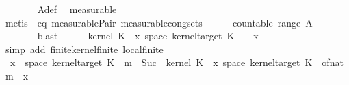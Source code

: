 \begin{isabellebody}
\ \ \ \ \ \ \isamarkupfalse%
\ A{\isacharunderscore}{\kern0pt}def\ \isamarkupfalse%
\ measurable\isanewline
\ \ \ \ \ \ \isamarkupfalse%
\ {\isacharparenleft}{\kern0pt}metis\ {\isasymomega}\ eq\ measurable{\isacharunderscore}{\kern0pt}Pair{}{\isacharprime}{\kern0pt}\ measurable{\isacharunderscore}{\kern0pt}cong{\isacharunderscore}{\kern0pt}sets{\isacharparenright}{\kern0pt}\isanewline
\ \ \ \ \isamarkupfalse%
\ {\isachardoublequoteopen}countable\ {\isacharparenleft}{\kern0pt}range\ {\isacharparenleft}{\kern0pt}A\ {\isasymomega}\isanewline
\ \ \ \ \ \ \isamarkupfalse%
\ blast\isanewline
\ \ \ \ \isamarkupfalse%
\ {\isachardoublequoteopen}{\isacharparenleft}{\kern0pt}kernel\ K{\isacharunderscore}{\kern0pt}{}\ {\isacharparenleft}{\kern0pt}{\isasymomega}\ x{\isacharparenright}{\kern0pt}\ {\isacharparenleft}{\kern0pt}space\ {\isacharparenleft}{\kern0pt}kernel{\isacharunderscore}{\kern0pt}target\ K{\isacharunderscore}{\kern0pt}{}{\isacharparenright}{\kern0pt}{\isacharparenright}{\kern0pt}{\isacharparenright}{\kern0pt}\ {\isasymnoteq}\ {\isasyminfinity}{\isachardoublequoteclose}\ \ x\isanewline
\ \ \ \ \ \ \isamarkupfalse%
\ {\isacharparenleft}{\kern0pt}simp\ add{\isacharcolon}{\kern0pt}\ finite{\isacharunderscore}{\kern0pt}kernel{\isacharunderscore}{\kern0pt}finite\ local{\isachardot}{\kern0pt}finite{\isacharparenleft}{\kern0pt}{}{\isacharparenright}{\kern0pt}{\isacharparenright}{\kern0pt}\isanewline
\ \ \ \ \isamarkupfalse%
\ \isamarkupfalse%
\ {\isacharasterisk}{\kern0pt}{\isacharcolon}{\kern0pt}\ {\isachardoublequoteopen}x\ {\isasymin}\ space\ {\isacharparenleft}{\kern0pt}kernel{\isacharunderscore}{\kern0pt}target\ K{\isacharunderscore}{\kern0pt}{}{\isacharparenright}{\kern0pt}\ {\isasymLongrightarrow}\ {\isasymexists}m\ {\isasymin}\ {\isacharbraceleft}{\kern0pt}Suc\ {}{\isachardot}{\kern0pt}{\isachardot}{\kern0pt}{\isacharbraceright}{\kern0pt}{\isachardot}{\kern0pt}\ {\isacharparenleft}{\kern0pt}kernel\ K{\isacharunderscore}{\kern0pt}{}\ {\isacharparenleft}{\kern0pt}{\isasymomega}\ x{\isacharparenright}{\kern0pt}\ {\isacharparenleft}{\kern0pt}space\ {\isacharparenleft}{\kern0pt}kernel{\isacharunderscore}{\kern0pt}target\ K{\isacharunderscore}{\kern0pt}{}{\isacharparenright}{\kern0pt}{\isacharparenright}{\kern0pt}{\isacharparenright}{\kern0pt}\ {\isacharless}{\kern0pt}\ of{\isacharunderscore}{\kern0pt}nat\ m{\isachardoublequoteclose}\ \ x\isanewline

\end{isabellebody}
